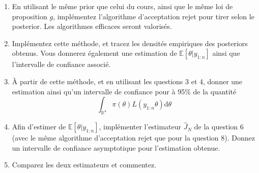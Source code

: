 \documentclass[]{article}
\begin{document}
\begin{enumerate}
\def\labelenumi{\arabic{enumi}.}
\setcounter{enumi}{6}
\item
  En utilisant le même prior que celui du cours, ainsi que le même loi
  de proposition \(g\), implémentez l'algorithme d'acceptation rejet
  pour tirer selon le posterior. Les algorithmes efficaces seront
  valorisés.
\item
  Implémentez cette méthode, et tracez les densités empiriques des
  posteriors obtenus. Vous donnerez également une estimation de
  \(\mathbb{E}[\theta \vert y_{1:n}]\) ainsi que l'intervalle de
  confiance associé.
\item
  À partir de cette méthode, et en utilisant les questions 3 et 4,
  donner une estimation ainsi qu'un intervalle de confiance pour à 95\%
  de la quantité
  \[\int_{\mathbb{R}^4}\pi(\theta)L(y_{1:n}\theta) \text{d} \theta\]
\item
  Afin d'estimer de \(\mathbb{E}[\theta \vert y_{1:n}]\), implémenter
  l'estimateur \(\hat{J}_N\) de la question 6 (avec le même algorithme
  d'acceptation rejet que pour la question 8). Donnez un intervalle de
  confiance asymptotique pour l'estimation obtenue.
\item
  Comparez les deux estimateurs et commentez.
\end{enumerate}
\end{document}
